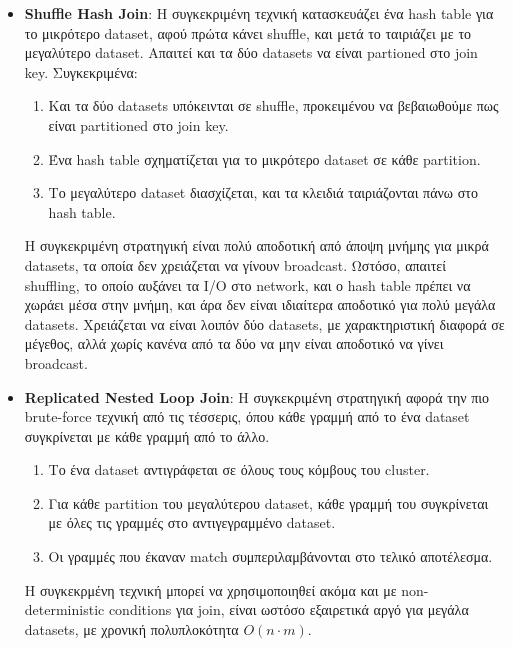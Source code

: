 \documentclass{article}
\begin{document}
\begin{itemize}
    \item \textbf{Shuffle Hash Join}: Η συγκεκριμένη τεχνική κατασκευάζει ένα hash table για το μικρότερο dataset, αφού πρώτα κάνει shuffle, και μετά το ταιριάζει με το μεγαλύτερο dataset. Απαιτεί και τα δύο datasets να είναι partioned στο join key. Συγκεκριμένα: 
	\begin{enumerate}
		\item Και τα δύο datasets υπόκεινται σε shuffle, προκειμένου να βεβαιωθούμε πως είναι partitioned στο join key. 
		\item Ένα hash table σχηματίζεται για το μικρότερο dataset σε κάθε partition.
		\item Το μεγαλύτερο dataset διασχίζεται, και τα κλειδιά ταιριάζονται πάνω στο hash table. 
	\end{enumerate}
	Η συγκεκριμένη στρατηγική είναι πολύ αποδοτική από άποψη μνήμης για μικρά datasets, τα οποία δεν χρειάζεται να γίνουν broadcast. Ωστόσο, απαιτεί shuffling, το οποίο αυξάνει τα I/O στο network, και ο hash table πρέπει να χωράει μέσα στην μνήμη, και άρα δεν είναι ιδιαίτερα αποδοτικό για πολύ μεγάλα datasets. Χρειάζεται να είναι λοιπόν δύο datasets, με χαρακτηριστική διαφορά σε μέγεθος, αλλά χωρίς κανένα από τα δύο να μην είναι αποδοτικό να γίνει broadcast. 
    \item \textbf{Replicated Nested Loop Join}: Η συγκεκριμένη στρατηγική αφορά την πιο brute-force τεχνική από τις τέσσερις, όπου κάθε γραμμή από το ένα dataset συγκρίνεται με κάθε γραμμή από το άλλο. 
	\begin{enumerate}
		\item Το ένα dataset αντιγράφεται σε όλους τους κόμβους του cluster. 
		\item Για κάθε partition του μεγαλύτερου dataset, κάθε γραμμή του συγκρίνεται με όλες τις γραμμές στο αντιγεγραμμένο dataset. 
		\item Οι γραμμές που έκαναν match συμπεριλαμβάνονται στο τελικό αποτέλεσμα.
	\end{enumerate} 
Η συγκεκρμένη τεχνική μπορεί να χρησιμοποιηθεί ακόμα και με non-deterministic conditions για join, είναι ωστόσο εξαιρετικά αργό για μεγάλα datasets, με χρονική πολυπλοκότητα $O(n \cdot m)$.
\end{itemize}
\end{document}
